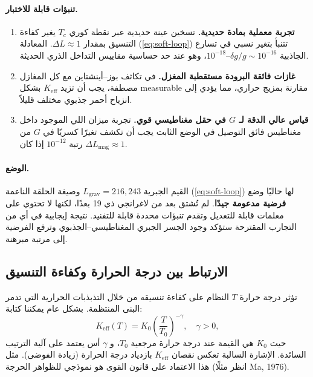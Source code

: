 \documentclass[11pt,a4paper]{article}
\newcommand{\Keff}{K_{\mathrm{eff}}}
\begin{document}
	\paragraph{تنبؤات قابلة للاختبار.}
	\begin{enumerate}
		\item \textbf{تجربة معملية بمادة حديدية.} تسخين عينة حديدية عبر نقطة كوري $T_c$ يغير كفاءة التنسيق بمقدار $\Delta L \approx 1$. المعادلة (\ref{eq:soft-loop}) تتنبأ بتغير نسبي في تسارع الجاذبية $\delta g / g \sim 10^{-16}$–$10^{-18}$، وهو عند حد حساسية مقاييس التداخل الذري الحديثة.
		\item \textbf{غازات فائقة البرودة مستقطبة المغزل.} في تكاثف بوز–أينشتاين مع كل المغازل مصطفة، يجب أن تزيد $K_{\mathrm{eff}}$ بشكل measurable مقارنة بمزيج حراري، مما يؤدي إلى انزياح أحمر جذبوي مختلف قليلاً.
		\item \textbf{قياس عالي الدقة لـ $G$ في حقل مغناطيسي قوي.} تجربة ميزان اللي الموجود داخل مغناطيس فائق التوصيل في الوضع الثابت يجب أن تكشف تغيرًا كسريًا في $G$ من رتبة $10^{-12}$ إذا كان $\Delta L_{\mathrm{mag}} \approx 1$.
	\end{enumerate}
	
	\paragraph{الوضع.}
	القيم الجبرية $L_{\mathrm{grav}} = 216, 243$ وصيغة الحلقة الناعمة (\ref{eq:soft-loop}) لها حاليًا وضع \textbf{فرضية مدعومة جيدًا}. لم تُشتق بعد من لاغرانجي ذي 19 بعدًا، لكنها لا تحتوي على معلمات قابلة للتعديل وتقدم تنبؤات محددة قابلة للتفنيد. نتيجة إيجابية في أي من التجارب المقترحة ستؤكد وجود الجسر الجبري المغناطيسي–الجذبوي وترفع الفرضية إلى مرتبة مبرهنة.
	
	\subsection{الارتباط بين درجة الحرارة وكفاءة التنسيق}
	\label{subsec:temp-keff}
	
	تؤثر درجة حرارة $T$ النظام على كفاءة تنسيقه من خلال التذبذبات الحرارية التي تدمر البنى المنتظمة. بشكل عام يمكننا كتابة:
	\begin{equation}
		\Keff(T) = K_0 \left( \frac{T}{T_0} \right)^{-\gamma}, \quad \gamma > 0,
		\label{eq:keff-temp}
	\end{equation}
	حيث $K_0$ هي القيمة عند درجة حرارة مرجعية $T_0$، و $\gamma$ أس يعتمد على آلية الترتيب السائدة. الإشارة السالبة تعكس نقصان $\Keff$ بازدياد درجة الحرارة (زيادة الفوضى). مثل هذا الاعتماد على قانون القوى هو نموذجي للظواهر الحرجة (انظر مثلًا Ma, 1976).
	
\end{document}
